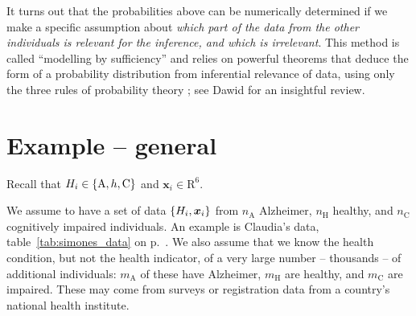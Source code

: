 \documentclass[\ifafour a4paper,12pt,\else a5paper,10pt,\fi%
onecolumn,oneside,article,%
british%
]{memoir}
\theoremstyle{remark}
\theoremstyle{innote}
\newcommand*{\citey}{\parencites*}
\renewcommand*{\cites}{\parencites}
\newcommand*{\RR}{\bm{\mathrm{R}}}
\DeclarePairedDelimiter\set{\{}{\}}
\renewcommand*{\|}{\mathpunct{|}}
\newcommand*{\sect}{\S}%
\newcommand*{\chap}{ch.}%
\newcommand*{\eg}{{e.g.}}
\newcommand*{\yH}{H}
\newcommand*{\yh}{h}
\newcommand*{\yx}{x}
\newcommand*{\yxx}{\bm{\yx}}
\newcommand*{\ya}{\mathrm{A}}
\newcommand*{\yi}{\mathrm{C}}
\newcommand*{\yhe}{\mathrm{H}}
\newcommand*{\yn}{n}
\newcommand*{\yna}{\yn_{\ya}}
\newcommand*{\ynh}{\yn_{\yhe}}
\newcommand*{\yni}{\yn_{\yi}}
\newcommand*{\yNa}{m_{\ya}}
\newcommand*{\yNh}{m_{\yhe}}
\newcommand*{\yNi}{m_{\yi}}
\theoremstyle{plain}
\begin{document}
\smallskip

It turns out that the probabilities above can be numerically determined if
we make a specific assumption about \emph{which part of the data from the
  other individuals is relevant for the inference, and which is
  irrelevant}. This method is called \enquote{modelling by sufficiency}
and relies on powerful theorems that deduce the form of a probability
distribution from inferential relevance of data, using only the three rules
of probability theory
\cites[\eg:][\chap~4]{bernardoetal1994_r2000}[\sect~5.5]{lindley1965b_r2008}{diaconisetal1981,lauritzen1982_r1988,kallenberg2005};
see Dawid \citey{dawid2013} for an insightful review.



\section{Example -- general}
\label{sec:example}

Recall that $\yH_i \in \set{\ya, \yh, \yi}$ and $\yxx_i \in \RR^6$.

We assume to have a set of data $\set{\yH_i,\yxx_i}$ from $\yna$ Alzheimer,
$\ynh$ healthy, and $\yni$ cognitively impaired individuals. An example is
Claudia's data, table~\ref{tab:simones_data} on
p.~\pageref{tab:simones_data}. We also assume that we know the health
condition, but not the health indicator, of a very large number --
thousands -- of additional individuals: $\yNa$ of these have Alzheimer,
$\yNh$ are healthy, and $\yNi$ are impaired. These may come from surveys or
registration data from a country's national health institute.


\medskip
\end{document}
